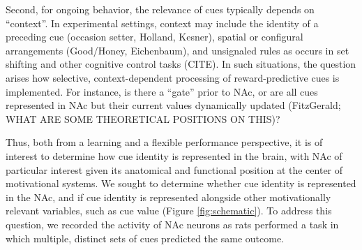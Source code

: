 \documentclass[11pt]{article}
\begin{document}
Second, for ongoing behavior, the relevance of cues typically depends on
“context”. In experimental settings, context may include the identity of a
preceding cue (occasion setter, Holland, Kesner), spatial or configural
arrangements (Good/Honey, Eichenbaum), and unsignaled rules as occurs in set
shifting and other cognitive control tasks (CITE). In such situations, the
question arises how selective, context-dependent processing of reward-predictive
cues is implemented. For instance, is there a “gate” prior to NAc, or are all
cues represented in NAc but their current values dynamically updated
(FitzGerald; WHAT ARE SOME THEORETICAL POSITIONS ON THIS)?

Thus, both from a learning and a flexible performance perspective, it is of
interest to determine how cue identity is represented in the brain, with NAc of
particular interest given its anatomical and functional position at the center
of motivational systems. We sought to determine whether cue identity is
represented in the NAc, and if cue identity is represented alongside other
motivationally relevant variables, such as cue value (Figure
\ref{fig:schematic}). To address this question, we recorded the activity of NAc
neurons as rats performed a task in which multiple, distinct sets of cues
predicted the same outcome.
\end{document}
